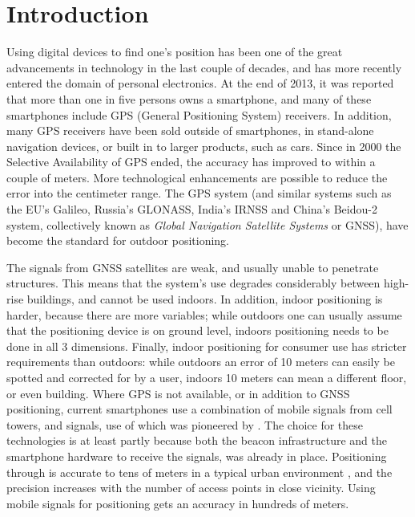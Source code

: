 \chapter{Introduction}
\setcounter{page}{1} 

Using digital devices to find one's position has been one of the great advancements in technology in the last couple of decades, and has more recently entered the domain of personal electronics.
At the end of 2013, it was reported that more than one in five persons owns a smartphone, and many of these smartphones include GPS (General Positioning System) receivers.
In addition, many GPS receivers have been sold outside of smartphones, in stand-alone navigation devices, or built in to larger products, such as cars.
Since in 2000 the Selective Availability of GPS ended, the accuracy has improved to within a couple of meters.
More technological enhancements are possible to reduce the error into the centimeter range.
The GPS system (and similar systems such as the EU's Galileo, Russia's GLONASS, India's IRNSS and China's Beidou-2 system, collectively known as \emph{Global Navigation Satellite Systems} or GNSS), have become the standard for outdoor positioning.

The signals from GNSS satellites are weak, and usually unable to penetrate structures.
This means that the system's use degrades considerably between high-rise buildings, and cannot be used indoors.
In addition, indoor positioning is harder, because there are more variables; while outdoors one can usually assume that the positioning device is on ground level, indoors positioning needs to be done in all 3 dimensions.
Finally, indoor positioning for consumer use has stricter requirements than outdoors: while outdoors an error of 10 meters can easily be spotted and corrected for by a user, indoors 10 meters can mean a different floor, or even building. 
Where GPS is not available, or in addition to GNSS positioning, current smartphones use a combination of mobile signals from cell towers, and \wifi signals, use of which was pioneered by \citet{bahl2000radar}.
The choice for these technologies is at least partly because both the beacon infrastructure and the smartphone hardware to receive the signals, was already in place.
Positioning through \wifi is accurate to tens of meters in a typical urban environment \citep{zandbergen2009accuracy}, and the precision increases with the number of access points in close vicinity.
Using mobile signals for positioning gets an accuracy in hundreds of meters.

